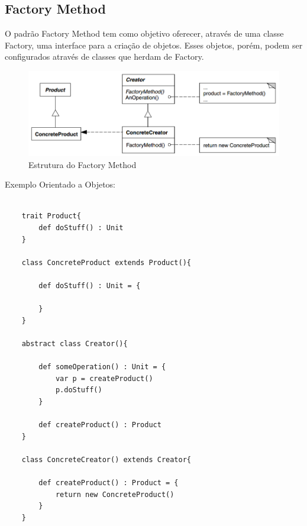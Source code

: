 \subsection{Factory Method}

O padrão Factory Method tem como objetivo oferecer, através de uma 
classe Factory, uma interface para a criação de objetos. Esses objetos, 
porém, podem ser configurados através de classes que herdam de Factory.


\begin{figure}[htb]
	\caption{\label{fig_grafico}Estrutura do Factory Method}
	\begin{center}
	    \includegraphics[scale=0.5]{5_padroes-contexto-funcional/5.1_criacionais/5.1.1_factory-method/diagram.png}
	\end{center}
\end{figure}

Exemplo Orientado a Objetos:

\begin{lstlisting}[caption={Factory Method Orientação a Objetos},label=oofactory]
    
    trait Product{
        def doStuff() : Unit
    }

    class ConcreteProduct extends Product(){

        def doStuff() : Unit = {
            
        }
    }

    abstract class Creator(){

        def someOperation() : Unit = {
            var p = createProduct()
            p.doStuff()
        }

        def createProduct() : Product
    }

    class ConcreteCreator() extends Creator{

        def createProduct() : Product = {
            return new ConcreteProduct()
        }
    }

\end{lstlisting}